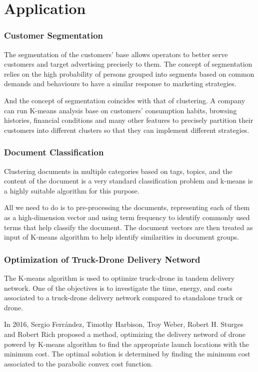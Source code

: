 \documentclass[9pt]{beamer}
\begin{document}
\section{Application}
\begin{frame}
	\frametitle{Customer Segmentation}
	The segmentation of the customers’ base allows operators to better serve customers and target advertising precisely to them.
The concept of segmentation relies on the high probability of persons grouped into segments based on common demands and behaviours to have a similar response to marketing strategies.
\par And the concept of segmentation coincides with that of clustering. A company can run K-means analysis base on customers' consumption habits, browsing histories, financial conditions and many other features to precisely partition their customers into different clusters so that they can implement different strategies.


\end{frame}

\begin{frame}
	\frametitle{Document Classification}
	Clustering documents in multiple categories based on tags, topics, and the content of the document is a very standard classification problem and k-means is a highly suitable algorithm for this purpose.
	\par All we need to do is to pre-processing the documents, representing each of them as a high-dimension vector and using term frequency to identify commonly used terms that help classify the document.
	The document vectors are then treated as input of K-means algorithm to help identify similarities in document groups.
	
\end{frame}

\begin{frame}
	\frametitle{Optimization of Truck-Drone Delivery Netword}
	The K-means algorithm is used to optimize truck-drone in tandem delivery network. One of the objectives is to investigate the time, energy, and costs associated to a truck-drone delivery network compared to standalone truck or drone. 
	\par In 2016, Sergio Ferr{\'a}ndez, Timothy Harbison, Troy Weber, Robert H. Sturges and Robert Rich proposed a method, optimizing the delivery netword of drone powerd by K-means algorithm to find the appropriate launch locations with the  minimum cost.  The optimal solution is determined by finding the minimum cost associated to the parabolic convex cost function.
	
\end{frame}
\end{document}
